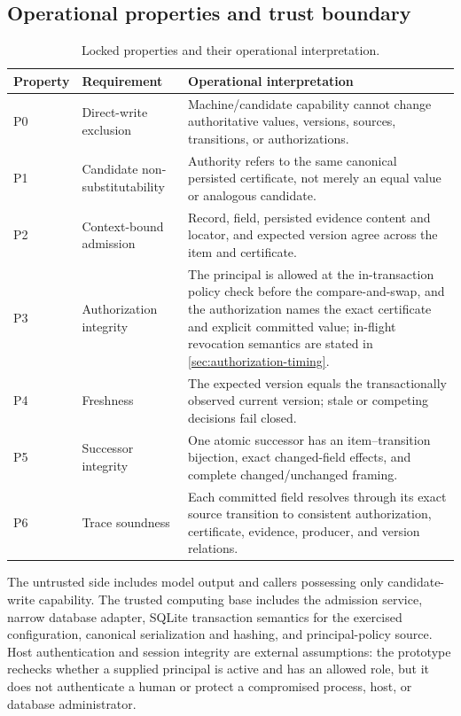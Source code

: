 \subsection{Operational properties and trust boundary}

\begin{table}[t]
\centering
\caption{Locked properties and their operational interpretation.}
\label{tab:properties}
\begin{tabularx}{\textwidth}{@{}l>{\raggedright\arraybackslash}p{}>{\raggedright\arraybackslash}X@{}}
\toprule
Property & Requirement & Operational interpretation \\
\midrule
P0 & Direct-write exclusion & Machine/candidate capability cannot change authoritative values, versions, sources, transitions, or authorizations. \\
P1 & Candidate non-substitutability & Authority refers to the same canonical persisted certificate, not merely an equal value or analogous candidate. \\
P2 & Context-bound admission & Record, field, persisted evidence content and locator, and expected version agree across the item and certificate. \\
P3 & Authorization integrity & The principal is allowed at the in-transaction policy check before the compare-and-swap, and the authorization names the exact certificate and explicit committed value; in-flight revocation semantics are stated in \cref{sec:authorization-timing}. \\
P4 & Freshness & The expected version equals the transactionally observed current version; stale or competing decisions fail closed. \\
P5 & Successor integrity & One atomic successor has an item--transition bijection, exact changed-field effects, and complete changed/unchanged framing. \\
P6 & Trace soundness & Each committed field resolves through its exact source transition to consistent authorization, certificate, evidence, producer, and version relations. \\
\bottomrule
\end{tabularx}
\end{table}

The untrusted side includes model output and callers possessing only candidate-write capability. The trusted computing base includes the admission service, narrow database adapter, SQLite transaction semantics for the exercised configuration, canonical serialization and hashing, and principal-policy source. Host authentication and session integrity are external assumptions: the prototype rechecks whether a supplied principal is active and has an allowed role, but it does not authenticate a human or protect a compromised process, host, or database administrator.

